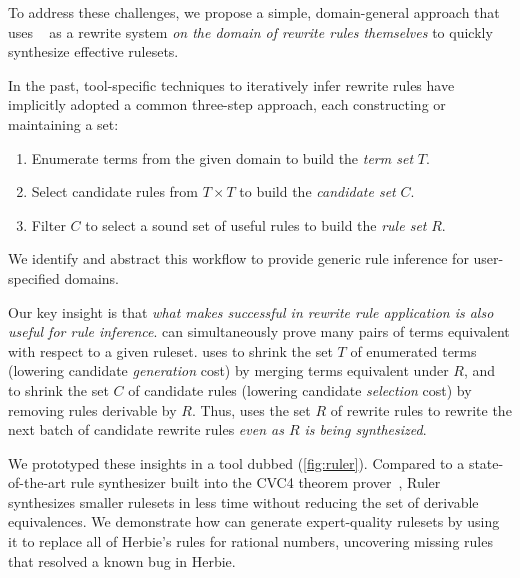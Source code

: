 To address these challenges,
  we propose a simple, domain-general approach
  that uses \eqsat~\cite{eqsat, egg} as
  a rewrite system \textit{on the domain of rewrite rules themselves}
  to quickly synthesize effective rulesets.

In the past, tool-specific techniques
  to iteratively infer rewrite rules
  have implicitly adopted a common three-step approach,
  each constructing or maintaining a set:
\begin{enumerate}
    \item Enumerate terms from the given domain to
          build the \textit{term set} $T$.
    \item Select candidate rules from $T \times T$
          to build the \textit{candidate set} $C$.
    \item Filter $C$ to select a sound set of
          useful rules to build the \textit{rule set} $R$.
\end{enumerate}
We identify and abstract this workflow
  to provide generic rule inference for user-specified domains.

Our key insight is that \emph{what
  makes \eqsat successful in rewrite rule application
  is also useful for rule inference}.
\Eqsat can simultaneously prove many pairs of terms equivalent
 with respect to a given ruleset.
 uses \eqsat to shrink
  the set $T$ of enumerated terms
  (lowering candidate \textit{generation} cost)
    by merging terms equivalent under $R$,
    and to shrink the set $C$ of candidate rules
  (lowering candidate \textit{selection} cost)
    by removing rules derivable by $R$.
Thus,  uses the set $R$ of rewrite rules
  to rewrite the next batch of candidate rewrite rules
  \textit{even as $R$ is being synthesized}.


We prototyped these insights in
  a tool dubbed  (\autoref{fig:ruler}).
Compared to a state-of-the-art
 rule synthesizer \cite{sat19} built
 into the CVC4 theorem prover~\cite{cvc4},
  Ruler synthesizes smaller rulesets in less time
  without reducing the set of derivable equivalences.
We demonstrate how 
  can generate expert-quality rulesets
  by using it to replace all of
  Herbie's rules for rational numbers,
  uncovering missing rules that
  resolved a known bug in Herbie.

